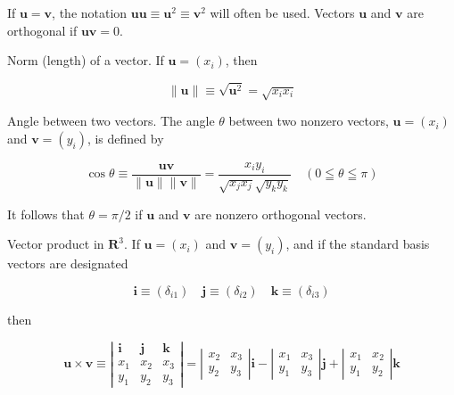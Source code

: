 \documentclass[10pt]{article}
\begin{document}
If $\mathbf{u}=\mathbf{v}$, the notation $\mathbf{u u} \equiv \mathbf{u}^{2} \equiv \mathbf{v}^{2}$ will often be used. Vectors $\mathbf{u}$ and $\mathbf{v}$ are orthogonal if $\mathbf{u v}=0$.

Norm (length) of a vector. If $\mathbf{u}=\left(x_{i}\right)$, then


\begin{equation*}
\|\mathbf{u}\| \equiv \sqrt{\mathbf{u}^{2}}=\sqrt{x_{i} x_{i}} \tag{2.8}
\end{equation*}


Angle between two vectors. The angle $\theta$ between two nonzero vectors, $\mathbf{u}=\left(x_{i}\right)$ and $\mathbf{v}=\left(y_{i}\right)$, is defined by


\begin{equation*}
\cos \theta \equiv \frac{\mathbf{u v}}{\|\mathbf{u}\|\|\mathbf{v}\|}=\frac{x_{i} y_{i}}{\sqrt{x_{j} x_{j}} \sqrt{y_{k} y_{k}}} \quad(0 \leqq \theta \leqq \pi) \tag{2.9}
\end{equation*}


It follows that $\theta=\pi / 2$ if $\mathbf{u}$ and $\mathbf{v}$ are nonzero orthogonal vectors.

Vector product in $\mathbf{R}^{3}$. If $\mathbf{u}=\left(x_{i}\right)$ and $\mathbf{v}=\left(y_{i}\right)$, and if the standard basis vectors are designated

$$
\mathbf{i} \equiv\left(\delta_{i 1}\right) \quad \mathbf{j} \equiv\left(\delta_{i 2}\right) \quad \mathbf{k} \equiv\left(\delta_{i 3}\right)
$$

then

\[
\mathbf{u} \times \mathbf{v} \equiv\left|\begin{array}{ccc}
\mathbf{i} & \mathbf{j} & \mathbf{k}  \tag{2.10a}\\
x_{1} & x_{2} & x_{3} \\
y_{1} & y_{2} & y_{3}
\end{array}\right|=\left|\begin{array}{ll}
x_{2} & x_{3} \\
y_{2} & y_{3}
\end{array}\right| \mathbf{i}-\left|\begin{array}{ll}
x_{1} & x_{3} \\
y_{1} & y_{3}
\end{array}\right| \mathbf{j}+\left|\begin{array}{ll}
x_{1} & x_{2} \\
y_{1} & y_{2}
\end{array}\right| \mathbf{k}
\]
\end{document}
